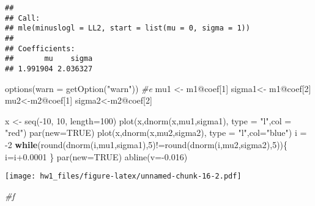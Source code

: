 \documentclass[
]{article}
\newenvironment{Shaded}{\begin{snugshade}}{\end{snugshade}}
\newcommand{\AttributeTok}[1]{\textcolor[rgb]{0.77,0.63,0.00}{#1}}
\newcommand{\CommentTok}[1]{\textcolor[rgb]{0.56,0.35,0.01}{\textit{#1}}}
\newcommand{\ConstantTok}[1]{\textcolor[rgb]{0.00,0.00,0.00}{#1}}
\newcommand{\ControlFlowTok}[1]{\textcolor[rgb]{0.13,0.29,0.53}{\textbf{#1}}}
\newcommand{\DecValTok}[1]{\textcolor[rgb]{0.00,0.00,0.81}{#1}}
\newcommand{\FloatTok}[1]{\textcolor[rgb]{0.00,0.00,0.81}{#1}}
\newcommand{\FunctionTok}[1]{\textcolor[rgb]{0.00,0.00,0.00}{#1}}
\newcommand{\NormalTok}[1]{#1}
\newcommand{\OtherTok}[1]{\textcolor[rgb]{0.56,0.35,0.01}{#1}}
\newcommand{\SpecialCharTok}[1]{\textcolor[rgb]{0.00,0.00,0.00}{#1}}
\newcommand{\StringTok}[1]{\textcolor[rgb]{0.31,0.60,0.02}{#1}}
\begin{document}
\begin{verbatim}
## 
## Call:
## mle(minuslogl = LL2, start = list(mu = 0, sigma = 1))
## 
## Coefficients:
##       mu    sigma 
## 1.991904 2.036327
\end{verbatim}

\begin{Shaded}
\begin{Highlighting}[]
\FunctionTok{options}\NormalTok{(}\AttributeTok{warn =} \FunctionTok{getOption}\NormalTok{(}\StringTok{"warn"}\NormalTok{))}
\CommentTok{\#e}
\NormalTok{mu1 }\OtherTok{\textless{}{-}}\NormalTok{ m1}\SpecialCharTok{@}\NormalTok{coef[}\DecValTok{1}\NormalTok{]}
\NormalTok{sigma1}\OtherTok{\textless{}{-}}\NormalTok{ m1}\SpecialCharTok{@}\NormalTok{coef[}\DecValTok{2}\NormalTok{]}
\NormalTok{mu2}\OtherTok{\textless{}{-}}\NormalTok{m2}\SpecialCharTok{@}\NormalTok{coef[}\DecValTok{1}\NormalTok{]}
\NormalTok{sigma2}\OtherTok{\textless{}{-}}\NormalTok{m2}\SpecialCharTok{@}\NormalTok{coef[}\DecValTok{2}\NormalTok{]}

\NormalTok{x }\OtherTok{\textless{}{-}} \FunctionTok{seq}\NormalTok{(}\SpecialCharTok{{-}}\DecValTok{10}\NormalTok{, }\DecValTok{10}\NormalTok{, }\AttributeTok{length=}\DecValTok{100}\NormalTok{)}
\FunctionTok{plot}\NormalTok{(x,}\FunctionTok{dnorm}\NormalTok{(x,mu1,sigma1), }\AttributeTok{type =} \StringTok{"l"}\NormalTok{,}\AttributeTok{col =} \StringTok{"red"}\NormalTok{)}
\FunctionTok{par}\NormalTok{(}\AttributeTok{new=}\ConstantTok{TRUE}\NormalTok{)}
\FunctionTok{plot}\NormalTok{(x,}\FunctionTok{dnorm}\NormalTok{(x,mu2,sigma2), }\AttributeTok{type =} \StringTok{"l"}\NormalTok{,}\AttributeTok{col=}\StringTok{"blue"}\NormalTok{)}
\NormalTok{i }\OtherTok{=} \SpecialCharTok{{-}}\DecValTok{2}
\ControlFlowTok{while}\NormalTok{(}\FunctionTok{round}\NormalTok{(}\FunctionTok{dnorm}\NormalTok{(i,mu1,sigma1),}\DecValTok{5}\NormalTok{)}\SpecialCharTok{!=}\FunctionTok{round}\NormalTok{(}\FunctionTok{dnorm}\NormalTok{(i,mu2,sigma2),}\DecValTok{5}\NormalTok{))\{}
\NormalTok{  i}\OtherTok{=}\NormalTok{i}\FloatTok{+0.0001}
\NormalTok{\}}
\FunctionTok{par}\NormalTok{(}\AttributeTok{new=}\ConstantTok{TRUE}\NormalTok{)}
\FunctionTok{abline}\NormalTok{(}\AttributeTok{v=}\SpecialCharTok{{-}}\FloatTok{0.016}\NormalTok{)}
\end{Highlighting}
\end{Shaded}

\texttt{[image: hw1\_files/figure-latex/unnamed-chunk-16-2.pdf]}

\begin{Shaded}
\begin{Highlighting}[]
\CommentTok{\#f}
\end{Highlighting}
\end{Shaded}
\end{document}

